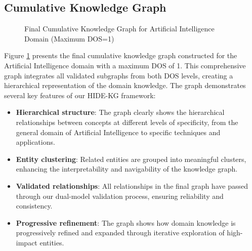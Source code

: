 \documentclass[11pt]{article}
\begin{document}
\subsection{Cumulative Knowledge Graph}

\begin{figure}[H]
    \centering
    \caption{Final Cumulative Knowledge Graph for Artificial Intelligence Domain (Maximum DOS=1)}
    \label{fig:final_kg}
\end{figure}

Figure \ref{fig:final_kg} presents the final cumulative knowledge graph constructed for the Artificial Intelligence domain with a maximum DOS of 1. This comprehensive graph integrates all validated subgraphs from both DOS levels, creating a hierarchical representation of the domain knowledge. The graph demonstrates several key features of our HIDE-KG framework:

\begin{itemize}
    \item \textbf{Hierarchical structure}: The graph clearly shows the hierarchical relationships between concepts at different levels of specificity, from the general domain of Artificial Intelligence to specific techniques and applications.

    \item \textbf{Entity clustering}: Related entities are grouped into meaningful clusters, enhancing the interpretability and navigability of the knowledge graph.

    \item \textbf{Validated relationships}: All relationships in the final graph have passed through our dual-model validation process, ensuring reliability and consistency.

    \item \textbf{Progressive refinement}: The graph shows how domain knowledge is progressively refined and expanded through iterative exploration of high-impact entities.
\end{itemize}
\end{document}
